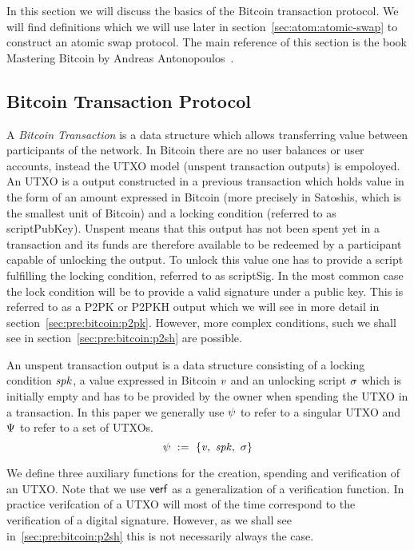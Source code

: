 In this section we will discuss the basics of the Bitcoin transaction protocol.
We will find definitions which we will use later in section~\ref{sec:atom:atomic-swap} to construct an atomic swap protocol.
The main reference of this section is the book Mastering Bitcoin by Andreas Antonopoulos~\cite{antonopoulos2014mastering}.

\subsection{Bitcoin Transaction Protocol}\label{subsec:pre:bitcointx}

A \emph{Bitcoin Transaction} is a data structure which allows transferring value between participants of the network.
In Bitcoin there are no user balances or user accounts, instead the UTXO model (unspent transaction outputs) is empoloyed.
An UTXO is a output constructed in a previous transaction which holds value in the form of an amount expressed in
Bitcoin (more precisely in Satoshis, which is the smallest unit of Bitcoin) and a locking condition (referred to as
scriptPubKey).
Unspent means that this output has not been spent yet in a transaction and its funds are therefore available to be redeemed by a participant capable of unlocking the output.
To unlock this value one has to provide a script fulfilling the locking condition, referred to as scriptSig.
In the most common case the lock condition will be to provide a valid signature under a public key.
This is referred to as a P2PK or P2PKH output which we will see in more detail in section~\ref{sec:pre:bitcoin:p2pk}.
However, more complex conditions, such we shall see in section~\ref{sec:pre:bitcoin:p2sh} are possible.

\begin{definition} An unspent transaction output is a data structure
consisting of a locking condition $\mathit{spk}$, a value expressed in Bitcoin $\mathit{v}$ and an unlocking script $\mathit{\sigma}$ which is
initially empty and has to be provided by the owner when spending the UTXO in a transaction. In this paper we
generally use $\psi$ to refer to a singular UTXO and $\Psi$ to refer to a set of UTXOs.
    \[ \psi ~:=~ \{ \mathit{v} ,~ \mathit{spk} ,~ \mathit{\sigma} \} \]
\end{definition}

We define three auxiliary functions for the creation, spending and verification of an UTXO.
Note that we use $\mathsf{verf}$ as a generalization of a verification function.
In practice verifcation of a UTXO will most of the time correspond to the verification of a digital signature.
However, as we shall see in~\ref{sec:pre:bitcoin:p2sh} this is not necessarily always the case.

